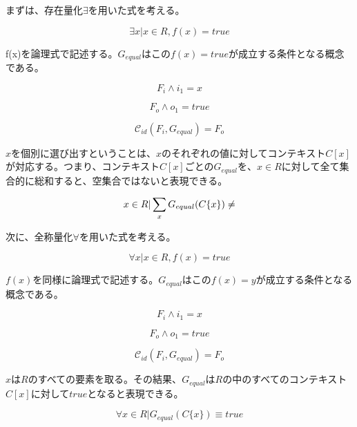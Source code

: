 \documentclass[12pt]{article}
\begin{document}
まずは、存在量化\(\exists\)を用いた式を考える。

\begin{equation} \exists x | x \in R , f(x) = true \end{equation}

f(x)を論理式で記述する。\(G_{equal}\)はこの\(f(x)=true\)が成立する条件となる概念である。

\begin{equation} F_i \wedge i_1 = x\end{equation}

\begin{equation} F_o \wedge o_1 = true\end{equation}

\begin{equation} \mathcal{C}_{id}(F_i,G_{equal}) = F_o \end{equation}

\(x\)を個別に選び出すということは、\(x\)のそれぞれの値に対してコンテキスト\(C[x]\)が対応する。つまり、コンテキスト\(C[x]\)ごとの\(G_{equal}\)を、\(x \in R\)に対して全て集合的に総和すると、空集合ではないと表現できる。

\begin{equation}  x \in R | \sum_x G_{equal} ( C\{x\}) \neq \empty \end{equation}

次に、全称量化\(\forall\)を用いた式を考える。

\begin{equation} \forall x | x \in R ,f(x)=true\end{equation}

\(f(x)\)を同様に論理式で記述する。\(G_{equal}\)はこの\(f(x)=y\)が成立する条件となる概念である。

\begin{equation} F_i \wedge i_1 = x\end{equation}

\begin{equation} F_o \wedge o_1 = true\end{equation}

\begin{equation} \mathcal{C}_{id}(F_i,G_{equal}) = F_o \end{equation}

\(x\)は\(R\)のすべての要素を取る。その結果、\(G_{equal}\)は\(R\)の中のすべてのコンテキスト\(C[x]\)に対して\(true\)となると表現できる。

\begin{equation} \forall x \in R|  G_{equal} (C\{x\}) \equiv true \end{equation}
\end{document}
